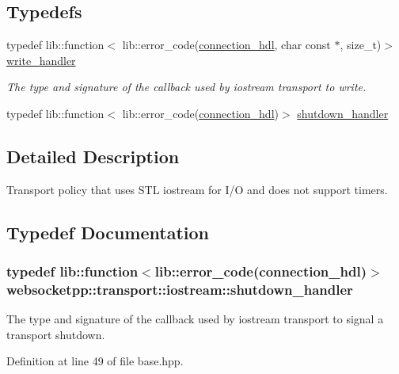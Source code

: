 \subsection*{Typedefs}
\begin{DoxyCompactItemize}
\item 
typedef lib\+::function$<$ lib\+::error\+\_\+code(\hyperlink{namespacewebsocketpp_a6b3d26a10ee7229b84b776786332631d}{connection\+\_\+hdl}, char const $\ast$, size\+\_\+t)$>$ \hyperlink{namespacewebsocketpp_1_1transport_1_1iostream_abc22b834c2d0c698d6c87e51d5bfad2c}{write\+\_\+handler}\hypertarget{namespacewebsocketpp_1_1transport_1_1iostream_abc22b834c2d0c698d6c87e51d5bfad2c}{}\label{namespacewebsocketpp_1_1transport_1_1iostream_abc22b834c2d0c698d6c87e51d5bfad2c}

\begin{DoxyCompactList}\small\item\em The type and signature of the callback used by iostream transport to write. \end{DoxyCompactList}\item 
typedef lib\+::function$<$ lib\+::error\+\_\+code(\hyperlink{namespacewebsocketpp_a6b3d26a10ee7229b84b776786332631d}{connection\+\_\+hdl})$>$ \hyperlink{namespacewebsocketpp_1_1transport_1_1iostream_a3563ce2cca06b1466f7d76ecb8eb4a0b}{shutdown\+\_\+handler}
\end{DoxyCompactItemize}


\subsection{Detailed Description}
Transport policy that uses S\+TL iostream for I/O and does not support timers. 

\subsection{Typedef Documentation}
\subsubsection[{\texorpdfstring{shutdown\+\_\+handler}{shutdown\_handler}}]{\setlength{\rightskip}{0pt plus 5cm}typedef lib\+::function$<$lib\+::error\+\_\+code({\bf connection\+\_\+hdl})$>$ {\bf websocketpp\+::transport\+::iostream\+::shutdown\+\_\+handler}}\hypertarget{namespacewebsocketpp_1_1transport_1_1iostream_a3563ce2cca06b1466f7d76ecb8eb4a0b}{}\label{namespacewebsocketpp_1_1transport_1_1iostream_a3563ce2cca06b1466f7d76ecb8eb4a0b}
The type and signature of the callback used by iostream transport to signal a transport shutdown. 

Definition at line 49 of file base.\+hpp.

